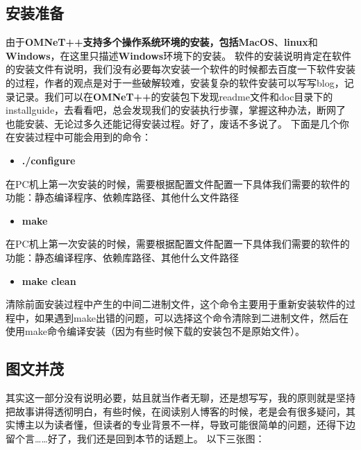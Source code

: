 \subsection{安装准备}
\label{安装准备}

由于\textbf{OMNeT++\textbf{支持多个操作系统环境的安装，包括}MacOS}、\textbf{linux}和\textbf{Windows}，在这里只描述\textbf{Windows}环境下的安装。
软件的安装说明肯定在软件的安装文件有说明，我们没有必要每次安装一个软件的时候都去百度一下软件安装的过程，作者的观点是对于一些破解较难，安装复杂的软件安装可以写写blog，记录记录。我们可以在\textbf{OMNeT++}的安装包下发现readme文件和doc目录下的installguide，去看看吧，总会发现我们的安装执行步骤，掌握这种办法，断网了也能安装、无论过多久还能记得安装过程。好了，废话不多说了。
下面是几个你在安装过程中可能会用到的命令：

\begin{itemize}
\item \textbf{.\slash configure}

\end{itemize}

在PC机上第一次安装的时候，需要根据配置文件配置一下具体我们需要的软件的功能：静态编译程序、依赖库路径、其他什么文件路径

\begin{itemize}
\item \textbf{make}

\end{itemize}

在PC机上第一次安装的时候，需要根据配置文件配置一下具体我们需要的软件的功能：静态编译程序、依赖库路径、其他什么文件路径

\begin{itemize}
\item \textbf{make clean}

\end{itemize}

清除前面安装过程中产生的中间二进制文件，这个命令主要用于重新安装软件的过程中，如果遇到make出错的问题，可以选择这个命令清除到二进制文件，然后在使用make命令编译安装（因为有些时候下载的安装包不是原始文件）。

\subsection{图文并茂}
\label{图文并茂}

其实这一部分没有说明必要，姑且就当作者无聊，还是想写写，我的原则就是坚持把故事讲得透彻明白，有些时候，在阅读别人博客的时候，老是会有很多疑问，其实博主以为读者懂，但读者的专业背景不一样，导致可能很简单的问题，还得下边留个言{\ldots}{\ldots}好了，我们还是回到本节的话题上。
以下三张图：

